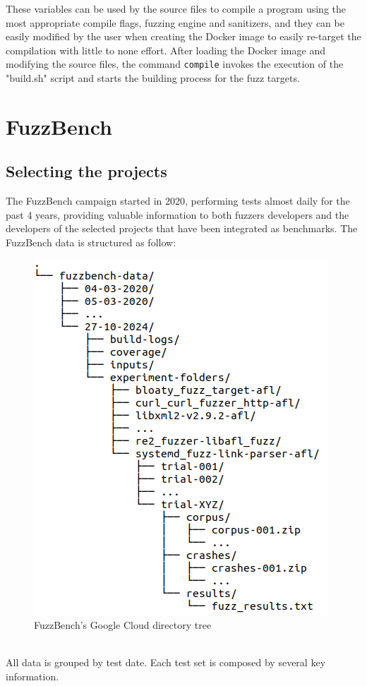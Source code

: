 These variables can be used by the source files to compile a program using the most appropriate compile flags, fuzzing engine and sanitizers, and they can be easily modified by the user when creating the Docker image to easily re-target the compilation with little to none effort.
After loading the Docker image and modifying the source files, the command \verb|compile| invokes the execution of the "build.sh" script and starts the building process for the fuzz targets.


\section{FuzzBench}
\subsection{Selecting the projects}
The FuzzBench campaign started in 2020, performing tests almost daily for the past 4 years, providing valuable information to both fuzzers developers and the developers of the selected projects that have been integrated as benchmarks.
The FuzzBench data is structured as follow:
\begin{figure}[h]
\centering
\includegraphics[scale=0.4]{foto/tree.png}
\caption{FuzzBench's Google Cloud directory tree}
\label{fig:tree}
\end{figure}
\ \\
All data is grouped by test date.
Each test set is composed by several key information.

